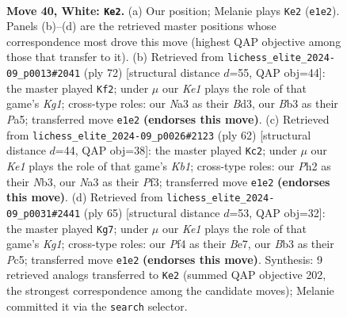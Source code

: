 \documentclass[11pt]{article}
\begin{document}
\clearpage

\begin{figure}[p]\centering
\begin{subfigure}{0.46\textwidth}\centering
\resizebox{\linewidth}{!}{%
\newchessgame
\chessboard[
  setfen={r7/p2p2k1/bpp5/5p1p/1PP1nP2/NB6/P2P3P/2R1K3 w - - 4 40},
  showmover=false,
  pgfstyle=straightmove, color=movearrow, markmove={e1-e2}
]}
\caption{}
\end{subfigure}\hfill
\begin{subfigure}{0.46\textwidth}\centering
\resizebox{\linewidth}{!}{%
\newchessgame
\chessboard[
  setfen={8/p1pb4/2pn1k1p/P3p3/1P2P3/2PB1NP1/6P1/6K1 w - - 5 37},
  showmover=false,
  pgfstyle=straightmove, color=movearrow, markmove={g1-f2}
]}
\caption{}
\end{subfigure}
\\[4pt]
\begin{subfigure}{0.46\textwidth}\centering
\resizebox{\linewidth}{!}{%
\newchessgame
\chessboard[
  setfen={7r/p2k2p1/2p5/1p1nPpPp/1P6/1NP2P2/1P6/1K2R3 w - - 3 32},
  showmover=false,
  pgfstyle=straightmove, color=movearrow, markmove={b1-c2}
]}
\caption{}
\end{subfigure}\hfill
\begin{subfigure}{0.46\textwidth}\centering
\resizebox{\linewidth}{!}{%
\newchessgame
\chessboard[
  setfen={1r4k1/4bp1p/4p3/2p1n1p1/8/2pP2P1/4PPBP/R1B1K3 b - - 3 33},
  showmover=false,
  pgfstyle=straightmove, color=movearrow, markmove={g8-g7}
]}
\caption{}
\end{subfigure}
\caption{\textbf{Move 40, White: \texttt{Ke2}.} (a) Our position; Melanie plays \texttt{Ke2} (\texttt{e1e2}). Panels (b)--(d) are the retrieved master positions whose correspondence most drove this move (highest QAP objective among those that transfer to it). (b) Retrieved from \texttt{lichess\_elite\_2024-09\_p0013\#2041} (ply 72) [structural distance $d$=55, QAP obj=44]: the master played \texttt{Kf2}; under $\mu$ our \emph{Ke1} plays the role of that game's \emph{Kg1}; cross-type roles: our \emph{N}a3 as their \emph{B}d3, our \emph{B}b3 as their \emph{P}a5; transferred move \texttt{e1e2} \textbf{(endorses this move)}. (c) Retrieved from \texttt{lichess\_elite\_2024-09\_p0026\#2123} (ply 62) [structural distance $d$=44, QAP obj=38]: the master played \texttt{Kc2}; under $\mu$ our \emph{Ke1} plays the role of that game's \emph{Kb1}; cross-type roles: our \emph{P}h2 as their \emph{N}b3, our \emph{N}a3 as their \emph{P}f3; transferred move \texttt{e1e2} \textbf{(endorses this move)}. (d) Retrieved from \texttt{lichess\_elite\_2024-09\_p0031\#2441} (ply 65) [structural distance $d$=53, QAP obj=32]: the master played \texttt{Kg7}; under $\mu$ our \emph{Ke1} plays the role of that game's \emph{Kg1}; cross-type roles: our \emph{P}f4 as their \emph{B}e7, our \emph{B}b3 as their \emph{P}c5; transferred move \texttt{e1e2} \textbf{(endorses this move)}. Synthesis: 9 retrieved analogs transferred to \texttt{Ke2} (summed QAP objective 202, the strongest correspondence among the candidate moves); Melanie committed it via the \texttt{search} selector.}
\label{fig:thought-m78}
\end{figure}
\end{document}
